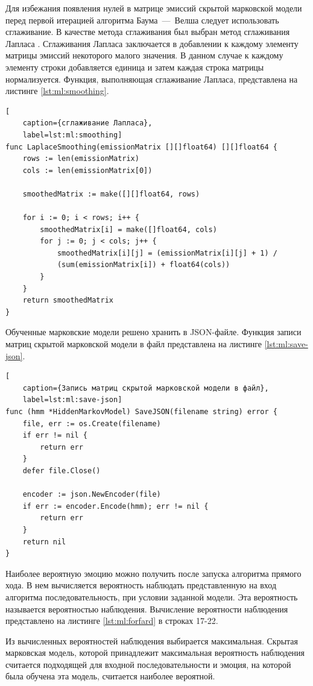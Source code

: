 Для избежания появления нулей в матрице эмиссий скрытой марковской модели перед первой итерацией алгоритма Баума~---~Велша следует использовать сглаживание. В качестве метода сглаживания был выбран метод сглаживания Лапласа \cite{smooting}.
%
Сглаживания Лапласа заключается в добавлении к каждому элементу матрицы эмиссий некоторого малого значения. В данном случае к каждому элементу строки добавляется единица и затем каждая строка матрицы нормализуется. Функция, выполняющая сглаживание Лапласа, представлена на листинге \ref{lst:ml:smoothing}.
\begin{lstlisting}[
	caption={сглаживание Лапласа},
	label=lst:ml:smoothing]
func LaplaceSmoothing(emissionMatrix [][]float64) [][]float64 {
	rows := len(emissionMatrix)
	cols := len(emissionMatrix[0])
	
	smoothedMatrix := make([][]float64, rows)
	
	for i := 0; i < rows; i++ {
		smoothedMatrix[i] = make([]float64, cols)
		for j := 0; j < cols; j++ {
			smoothedMatrix[i][j] = (emissionMatrix[i][j] + 1) /
			(sum(emissionMatrix[i]) + float64(cols))
		}
	}
	return smoothedMatrix
}
\end{lstlisting}
Обученные марковские модели решено хранить в JSON-файле. Функция записи матриц скрытой марковской модели в файл представлена на листинге \ref{lst:ml:save-json}.
\begin{lstlisting}[
	caption={Запись матриц скрытой марковской модели в файл},
	label=lst:ml:save-json]
func (hmm *HiddenMarkovModel) SaveJSON(filename string) error {
	file, err := os.Create(filename)
	if err != nil {
		return err
	}
	defer file.Close()
	
	encoder := json.NewEncoder(file)
	if err := encoder.Encode(hmm); err != nil {
		return err
	}
	return nil
}
\end{lstlisting}

Наиболее вероятную эмоцию можно получить после запуска алгоритма прямого хода. В нем вычисляется вероятность наблюдать представленную на вход алгоритма последовательность, при условии заданной модели. Эта вероятность называется вероятностью наблюдения. Вычисление вероятности наблюдения представлено на листинге \ref{lst:ml:forfard} в строках 17-22.

Из вычисленных вероятностей наблюдения выбирается максимальная. Скрытая марковская модель, которой принадлежит максимальная вероятность наблюдения считается подходящей для входной последовательности и эмоция, на которой была обучена эта модель, считается наиболее вероятной.

